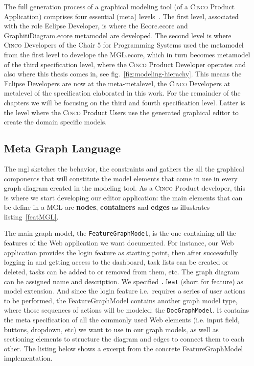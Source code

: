 The full generation process of a graphical modeling tool (of a \textsc{Cinco} Product Application) comprises four essential (meta) levels~\cite{Naujokat2018}. The first level, associated with the role Eclipse Developer, is where the Ecore.ecore and GraphitiDiagram.ecore metamodel are developed. The second level is where \textsc{Cinco} Developers of the Chair 5 for Programming Systems used the metamodel from the first level to develope the MGL.ecore, which in turn becomes metamodel of the third specification level, where the \textsc{Cinco} Product Developer operates and also where this thesis comes in, see fig.~\ref{fig:modeling-hierachy}. This means the Eclipse Developers are now at the meta-metalevel, the \textsc{Cinco} Developers at metalevel of the specification elaborated in this work. For the remainder of the chapters we will be focusing on the third and fourth specification level. Latter is the level where the \textsc{Cinco} Product Users use the generated graphical editor to create the domain specific models.

\subsection{Meta Graph Language}\label{sec:MGL}

The \gls*{mgl} sketches the behavior, the constraints and gathers the all the graphical components that will constitute the model elements that come in use in every graph diagram created in the modeling tool. As a \textsc{Cinco} Product developer, this is where we start developing our editor application: the main elements that can be define in a MGL are \textbf{nodes}, \textbf{containers} and \textbf{edges} as illustrates listing~\ref{featMGL}.

The main graph model, the \lstinline{FeatureGraphModel}, is the one containing all the features of the Web application we want documented. For instance, our  Web application provides the login feature as starting point, then after successfully logging in and getting access to the dashboard, task lists can be created or deleted, tasks can be added to or removed from them, etc. The graph diagram can be assigned name and description. We specified \lstinline{.feat} (short for feature) as model extension. And since the login feature i.e.~requires a series of user actions to be performed, the FeatureGraphModel contains another graph model type, where those sequences of actions will be modeled: the \lstinline{DocGraphModel}. It contains the meta specification of all the commonly used Web elements (i.e. input field, buttons, dropdown, etc) we want to use in our graph models, as well as sectioning elements to structure the diagram and edges to connect them to each other. The listing below shows a excerpt from the concrete FeatureGraphModel implementation.

